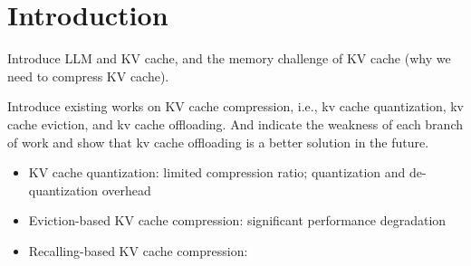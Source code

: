 \section{Introduction}

Introduce LLM and KV cache, and the memory challenge of KV cache (why we need to compress KV cache).

Introduce existing works on KV cache compression, i.e., kv cache quantization, kv cache eviction, and kv cache offloading. 
And indicate the weakness of each branch of work and show that kv cache offloading is a better solution in the future.
\begin{itemize}
    \item KV cache quantization: limited compression ratio; quantization and de-quantization overhead
    \item Eviction-based KV cache compression: significant performance degradation
    \item Recalling-based KV cache compression: 
\end{itemize}
